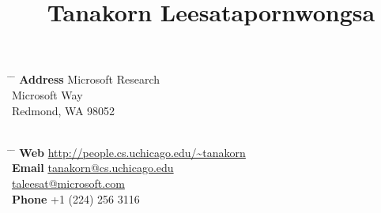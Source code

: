 \documentclass[10pt]{article} %
\begin{document}

\title{Tanakorn Leesatapornwongsa} %


\parbox{0.4\textwidth}{ %
\begin{tabbing} %
\hspace{1.5cm} \= \hspace{2cm} \= \kill %
{\bf Address} \> Microsoft Research\\ %
 Microsoft Way \\ %
\> Redmond, WA 98052 \\ %
\> \\
\end{tabbing}}
\hfill %
\parbox{0.6\textwidth}{ %
\begin{tabbing} %
\hspace{2.3cm} \= \hspace{2cm} \= \kill %
{\bf Web} \> \href{http://people.cs.uchicago.edu/\~tanakorn}{http://people.cs.uchicago.edu/\textasciitilde tanakorn} \\ %
{\bf Email} \> \href{mailto:tanakorn@cs.uchicago.edu}{tanakorn@cs.uchicago.edu} \\ %
\> \href{mailto:taleesat@microsoft.com}{taleesat@microsoft.com} \\
{\bf Phone} \> +1 (224) 256 3116 \\ %
\end{tabbing}}


\end{document}
